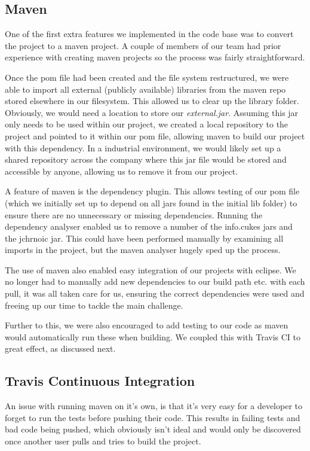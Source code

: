 \documentclass[a4paper]{article}
\begin{document}
\subsection{Maven}

One of the first extra features we implemented in the code base was to
convert the project to a maven project. A couple of members of our team
had prior experience with creating maven projects so the process was fairly
straightforward. 

Once the pom file had been created and the file system restructured, we were
able to import all external (publicly available) libraries from the maven repo
stored elsewhere in our filesystem. This allowed us to clear up the library folder.
Obviously, we would need a location to store our \emph{external.jar}. Assuming this
jar only needs to be used within our project, we created a local repository to
the project and pointed to it within our pom file, allowing maven to build our
project with this dependency. In a industrial environment, we would likely set
up a shared repository across the company where this jar file would be stored
and accessible by anyone, allowing us to remove it from our project.

A feature of maven is the dependency plugin. This allows testing of our pom file
(which we initially set up to depend on all jars found in the initial lib folder)
to ensure there are no unnecessary or missing dependencies. Running the
dependency analyser enabled us to remove a number of the info.cukes jars and
the jchrnoic jar. This could have been performed manually by examining all imports
in the project, but the maven analyser hugely sped up the process.

The use of maven also enabled easy integration of our projects with eclipse. We
no longer had to manually add new dependencies to our build path etc. with each
pull, it was all taken care for us, ensuring the correct dependencies were used
and freeing up our time to tackle the main challenge.

Further to this, we were also encouraged to add testing to our code as maven would
automatically run these when building. We coupled this with Travis CI to great effect,
as discussed next.

\subsection{Travis Continuous Integration}

An issue with running maven on it's own, is that it's very easy for a developer
to forget to run the tests before pushing their code. This results in failing tests 
and bad code being pushed, which obviously isn't ideal and would only be discovered
once another user pulls and tries to build the project.
\end{document}

